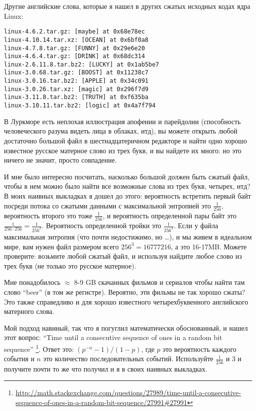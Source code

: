 Другие английские слова, которые я нашел в других сжатых исходных кодах ядра Linux:

\begin{lstlisting}
linux-4.6.2.tar.gz: [maybe] at 0x68e78ec
linux-4.10.14.tar.xz: [OCEAN] at 0x6bf0a8
linux-4.7.8.tar.gz: [FUNNY] at 0x29e6e20
linux-4.6.4.tar.gz: [DRINK] at 0x68dc314
linux-2.6.11.8.tar.bz2: [LUCKY] at 0x1ab5be7
linux-3.0.68.tar.gz: [BOOST] at 0x11238c7
linux-3.0.16.tar.bz2: [APPLE] at 0x34c091
linux-3.0.26.tar.xz: [magic] at 0x296f7d9
linux-3.11.8.tar.bz2: [TRUTH] at 0xf635ba
linux-3.10.11.tar.bz2: [logic] at 0x4a7f794
\end{lstlisting}

В Луркморе есть неплохая иллюстрация апофении и парейдолии (способность человеческого разума видеть лица в облаках, итд),
вы можете открыть любой достаточно большой файл в шестнадцатеричном редакторе и найти одно хорошо известное русское матерное слово из трех букв, и вы найдете их много: но это ничего не значит, просто совпадение.

И мне было интересно посчитать, насколько большой должен быть сжатый файл, чтобы в нем можно было найти все возможные слова из трех букв, четырех, итд?
В моих наивных выкладках я дошел до этого: вероятность встретить первый байт посреди потока со сжатыми данными с максимальной энтропией это 
$\frac{1}{256}$, вероятность второго это тоже $\frac{1}{256}$,
и вероятность определенной пары байт это $\frac{1}{256 \cdot 256} = \frac{1}{256^2}$.
Вероятность определенной тройки это $\frac{1}{256^3}$.
Если у файла максимальная энтропия (что почти недостижимо, но \dots), и мы живем в идеальном мире, вам нужен файл размером всего $256^3=16777216$, а это 16-17MB.
Можете проверите: возьмите любой сжатый файл, и используя  найдите любое слово из трех букв (не только это русское матерное).

Мне понадобилось $\approx$ 8-9 GB скачанных фильмов и сериалов чтобы найти там слово ``beer'' (в том же регистре).
Вероятно, эти фильмы не так хорошо сжаты?
Это также справедливо и для хорошо известного четырехбуквенного английского матерного слова.

Мой подход навиный, так что я погуглил математически обоснованный, и нашел этот вопрос:
``Time until a consecutive sequence of ones in a random bit sequence''
\footnote{\url{http://math.stackexchange.com/questions/27989/time-until-a-consecutive-sequence-of-ones-in-a-random-bit-sequence/27991#27991}}.
Ответ это: $(p^{−n}−1)/(1−p)$, где $p$ это вероятность каждого события и $n$ это количество последовательных событий.
Используйте $\frac{1}{256}$ и $3$ и получите почти то же что получил и я в своих наивных выкладках.

